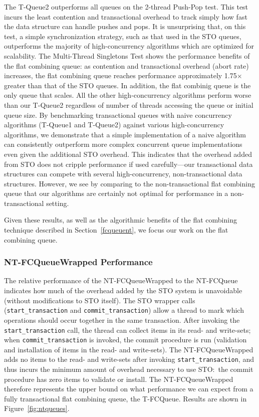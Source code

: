 The T-Queue2 outperforms all queues on the 2-thread Push-Pop test. This test incurs the least contention and transactional overhead to track simply how fast the data structure can handle pushes and pops. It is unsurprising that, on this test, a simple synchronization strategy, such as that used in the STO queues, outperforms the majority of high-concurrency algorithms which are optimized for scalability. The Multi-Thread Singletons Test shows the performance benefits of the flat combining queue: as contention and transactional overhead (abort rate) increases, the flat combining queue reaches performance approximately 1.75$\times$ greater than that of the STO queues. In addition, the flat combinig queue is the only queue that scales. All the other high-concurrency algorithms perform worse than our T-Queue2 regardless of number of threads accessing the queue or initial queue size.
By benchmarking transactional queues with naive concurrency algorithms (T-Queue1 and T-Queue2) against various high-concurrency algorithms, we demonstrate that a simple implementation of a naive algorithm can consistently outperform more complex concurrent queue implementations even given the additional STO overhead. This indicates that the overhead added from STO does not cripple performance if used carefully---our transactional data structures can compete with several high-concurrency, non-transactional data structures. However, we see by comparing to the non-transactional flat combining queue that our algorithms are certainly not optimal for performance in a non-transactional setting.

Given these results, as well as the algorithmic benefits of the flat combining technique described in Section~\ref{fcqueuent}, we focus our work on the flat combining queue.


\subsubsection{NT-FCQueueWrapped Performance}
The relative performance of the NT-FCQueueWrapped to the NT-FCQueue indicates how much of the overhead added by the STO system is unavoidable (without modifications to STO itself). The STO wrapper calls (\texttt{start\_transaction} and \texttt{commit\_transaction}) allow a thread to mark which operations should occur together in the same transaction. After invoking the \texttt{start\_transaction} call, the thread can collect items in its read- and write-sets; when \texttt{commit\_transaction} is invoked, the commit procedure is run (validation and installation of items in the read- and write-sets). The NT-FCQueueWrapped adds no items to the read- and write-sets after invoking \texttt{start\_transaction}, and thus incurs the minimum amount of overhead necessary to use STO:\ the commit procedure has zero items to validate or install. The NT-FCQueueWrapped therefore represents the upper bound on what performance we can expect from a fully transactional flat combining queue, the T-FCQueue. 
Results are shown in Figure~\ref{fig:ntqueues}. 

